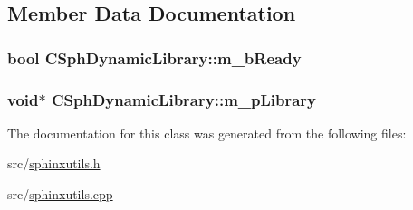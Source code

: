 \subsection{Member Data Documentation}
\hypertarget{classCSphDynamicLibrary_a2ed3025e14fa03ddb75ce1ddd9c5f064}{
\subsubsection[{m\-\_\-b\-Ready}]{\setlength{\rightskip}{0pt plus 5cm}bool C\-Sph\-Dynamic\-Library\-::m\-\_\-b\-Ready\hspace{0.3cm}{\ttfamily [private]}}}\label{classCSphDynamicLibrary_a2ed3025e14fa03ddb75ce1ddd9c5f064}
\hypertarget{classCSphDynamicLibrary_a8ff8943170bce29fbfa4c9f5fde677f9}{
\subsubsection[{m\-\_\-p\-Library}]{\setlength{\rightskip}{0pt plus 5cm}void$\ast$ C\-Sph\-Dynamic\-Library\-::m\-\_\-p\-Library\hspace{0.3cm}{\ttfamily [private]}}}\label{classCSphDynamicLibrary_a8ff8943170bce29fbfa4c9f5fde677f9}


The documentation for this class was generated from the following files\-:\begin{DoxyCompactItemize}
\item 
src/\hyperlink{sphinxutils_8h}{sphinxutils.\-h}\item 
src/\hyperlink{sphinxutils_8cpp}{sphinxutils.\-cpp}\end{DoxyCompactItemize}
